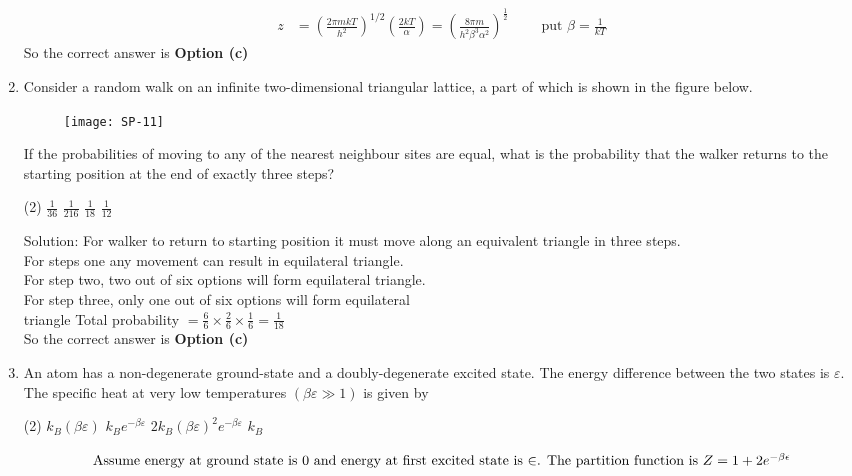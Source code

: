\begin{enumerate}
\begin{answer}
\begin{align*}
	z&=\left(\frac{2 \pi m k T}{h^{2}}\right)^{1 / 2}\left(\frac{2 k T}{\alpha}\right)=\left(\frac{8 \pi m}{h^{2} \beta^{3} \alpha^{2}}\right)^{\frac{1}{2}}\qquad
\text{	put }\beta=\frac{1}{k T}
	\end{align*}
		So the correct answer is \textbf{Option (c)}
\end{answer}
\item Consider a random walk on an infinite two-dimensional triangular lattice, a part of which is shown in the figure below.
\begin{figure}[H]
	\centering
	\texttt{[image: SP-11]}
\end{figure}
If the probabilities of moving to any of the nearest neighbour sites are equal, what is the probability that the walker returns to the starting position at the end of exactly three steps?
 \begin{tasks}(2)
	\task[\textbf{a.}]$\frac{1}{36}$
	\task[\textbf{b.}]$\frac{1}{216}$
	\task[\textbf{c.}] $\frac{1}{18}$
	\task[\textbf{d.}] $\frac{1}{12}$
\end{tasks}
\begin{answer}
Solution: For walker to return to starting position it must move along an equivalent triangle in three steps.\\
For steps one any movement can result in equilateral triangle.\\
For step two, two out of six options will form equilateral triangle.\\
For step three, only one out of six options will form equilateral\\ triangle Total probability $=\frac{6}{6} \times \frac{2}{6} \times \frac{1}{6}=\frac{1}{18}$\\
	So the correct answer is \textbf{Option (c)}
\end{answer}
\item 	An atom has a non-degenerate ground-state and a doubly-degenerate excited state. The energy difference between the two states is $\varepsilon$. The specific heat at very low temperatures $(\beta \varepsilon \gg 1)$ is given by
	 \begin{tasks}(2)
		\task[\textbf{a.}]$k_{B}(\beta \varepsilon)$
		\task[\textbf{b.}]$k_{B} e^{-\beta \varepsilon}$
		\task[\textbf{c.}] $2 k_{B}(\beta \varepsilon)^{2} e^{-\beta \varepsilon}$
		\task[\textbf{d.}]  $k_{B}$
	\end{tasks}
\begin{answer}
	\begin{align*}
	\intertext{Assume energy at ground state is 0 and energy at first excited state is $\in$. The partition function is $Z=1+2 e^{-\beta \epsilon}$}

\end{align*}
\end{answer}
\end{enumerate}
